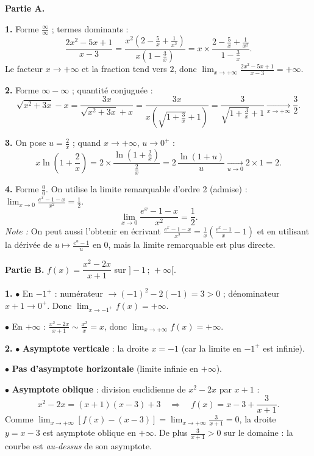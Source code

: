 \documentclass[11pt]{article}
\begin{document}
\begin{corrige}
\textbf{Partie A.}

\textbf{1.} Forme $\frac{\infty}{\infty}$ ; termes dominants :
\[ \frac{2x^2 - 5x + 1}{x - 3} = \frac{x^2\left(2 - \frac{5}{x} + \frac{1}{x^2}\right)}{x\left(1 - \frac{3}{x}\right)} = x \times \frac{2 - \frac{5}{x} + \frac{1}{x^2}}{1 - \frac{3}{x}}. \]
Le facteur $x \to +\infty$ et la fraction tend vers $2$, donc $\boxed{\lim_{x \to +\infty} \frac{2x^2 - 5x + 1}{x - 3} = +\infty}$.

\textbf{2.} Forme $\infty - \infty$ ; quantité conjuguée :
\[ \sqrt{x^2 + 3x} - x = \frac{3x}{\sqrt{x^2 + 3x} + x} = \frac{3x}{x\left(\sqrt{1 + \frac{3}{x}} + 1\right)} = \frac{3}{\sqrt{1 + \frac{3}{x}} + 1} \xrightarrow[x \to +\infty]{} \boxed{\frac{3}{2}}. \]

\textbf{3.} On pose $u = \frac{2}{x}$ ; quand $x \to +\infty$, $u \to 0^+$ :
\[ x \ln\left(1 + \frac{2}{x}\right) = 2 \times \frac{\ln\left(1 + \frac{2}{x}\right)}{\frac{2}{x}} = 2 \, \frac{\ln(1+u)}{u} \xrightarrow[u \to 0]{} 2 \times 1 = \boxed{2}. \]

\textbf{4.} Forme $\frac{0}{0}$. On utilise la limite remarquable d'ordre 2 (admise) : $\lim_{x \to 0} \frac{e^x - 1 - x}{x^2} = \frac{1}{2}$.
\[ \boxed{\lim_{x \to 0} \frac{e^x - 1 - x}{x^2} = \frac{1}{2}}. \]
\emph{Note :} On peut aussi l'obtenir en écrivant $\frac{e^x-1-x}{x^2} = \frac{1}{x}\left(\frac{e^x-1}{x} - 1\right)$ et en utilisant la dérivée de $u \mapsto \frac{e^u-1}{u}$ en $0$, mais la limite remarquable est plus directe.

\textbf{Partie B.} $f(x) = \dfrac{x^2 - 2x}{x + 1}$ sur $]-1\,;\,+\infty[$.

\textbf{1.} $\bullet$ En $-1^+$ : numérateur $\to (-1)^2 - 2(-1) = 3 > 0$ ; dénominateur $x + 1 \to 0^+$. Donc $\boxed{\lim_{x \to -1^+} f(x) = +\infty}$.

$\bullet$ En $+\infty$ : $\frac{x^2 - 2x}{x+1} \sim \frac{x^2}{x} = x$, donc $\boxed{\lim_{x \to +\infty} f(x) = +\infty}$.

\textbf{2.} $\bullet$ \textbf{Asymptote verticale} : la droite $x = -1$ (car la limite en $-1^+$ est infinie).

$\bullet$ \textbf{Pas d'asymptote horizontale} (limite infinie en $+\infty$).

$\bullet$ \textbf{Asymptote oblique} : division euclidienne de $x^2 - 2x$ par $x + 1$ :
\[ x^2 - 2x = (x+1)(x - 3) + 3 \quad \Longrightarrow \quad f(x) = x - 3 + \frac{3}{x+1}. \]
Comme $\lim_{x \to +\infty} \left[f(x) - (x-3)\right] = \lim_{x \to +\infty} \frac{3}{x+1} = 0$, la droite $\boxed{y = x - 3}$ est asymptote oblique en $+\infty$. De plus $\frac{3}{x+1} > 0$ sur le domaine : la courbe est \emph{au-dessus} de son asymptote.


\end{corrige}
\end{document}

